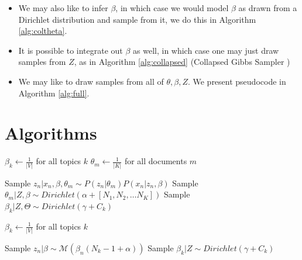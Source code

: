 \documentclass[a0,portrait]{a0poster}
\begin{document}
\begin{multicols}{2}
{\begin{itemize}
		\item We may also like to infer $\beta$, in which case we would model $\beta$ as drawn from a Dirichlet distribution and sample from it, we do this in Algorithm \ref{alg:coltheta}.
		
		\item It is possible to integrate out $\beta$ as well, in which case one may just draw samples from $Z$, as in Algorithm \ref{alg:collapsed} (Collapsed Gibbs Sampler \cite{griffiths2004collapsed})
		
		\item We may like to draw samples from all of $\theta, \beta, Z$. We present pseudocode in Algorithm \ref{alg:full}.
	\end{itemize}
}

\section{Algorithms}

\begin{minipage}{\linewidth}
	\label{alg:full}
	\begin{algorithmic}[1]
			 
			\State $\beta_k \gets \frac{1}{|V|} $ for all topics $k$
			\State $\theta_m \gets \frac{1}{|K|}$ for all documents $m$
			
						 \State Sample $z_n | x_n, \beta, \theta_m \sim P(z_{n}|\theta_m) P(x_{n}|z_{n}, \beta) $
					\EndFor
					\State Sample $\theta_m | Z, \beta \sim Dirichlet(\alpha + [N_1, N_2, \dots N_K])$ 
				\EndFor
					\State Sample $\beta_k | Z, \Theta \sim Dirichlet(\gamma + C_k)$
				\EndFor
			\EndFor
			\EndFunction
	\end{algorithmic}
\end{minipage}

\begin{minipage}{\linewidth}
	\label{alg:coltheta}
	\begin{algorithmic}[1]
		\State $\beta_k \gets \frac{1}{|V|} $ for all topics $k$
		
		\State Sample $z_n | \beta \sim \mathcal{M}(\beta_{n} (N_k - 1 + \alpha))$ 
		\EndFor
		\EndFor
		\State Sample $\beta_k | Z \sim Dirichlet(\gamma + C_k)$
		\EndFor
		\EndFor
		\EndFunction
	\end{algorithmic}
\end{minipage}


\end{multicols}
\end{document}
